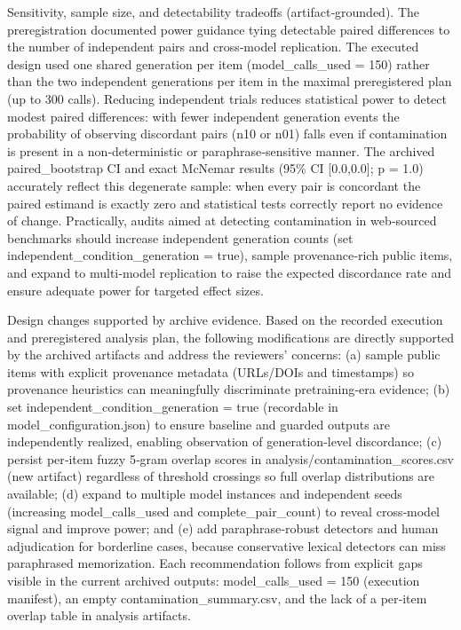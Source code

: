 \documentclass[conference]{IEEEtran}
\begin{document}
Sensitivity, sample size, and detectability tradeoffs (artifact‑grounded). The preregistration documented power guidance tying detectable paired differences to the number of independent pairs and cross‑model replication. The executed design used one shared generation per item (model\_calls\_used = 150) rather than the two independent generations per item in the maximal preregistered plan (up to 300 calls). Reducing independent trials reduces statistical power to detect modest paired differences: with fewer independent generation events the probability of observing discordant pairs (n10 or n01) falls even if contamination is present in a non‑deterministic or paraphrase‑sensitive manner. The archived paired\_bootstrap CI and exact McNemar results (95\% CI [0.0,0.0]; p = 1.0) accurately reflect this degenerate sample: when every pair is concordant the paired estimand is exactly zero and statistical tests correctly report no evidence of change. Practically, audits aimed at detecting contamination in web‑sourced benchmarks should increase independent generation counts (set independent\_condition\_generation = true), sample provenance‑rich public items, and expand to multi‑model replication to raise the expected discordance rate and ensure adequate power for targeted effect sizes.

Design changes supported by archive evidence. Based on the recorded execution and preregistered analysis plan, the following modifications are directly supported by the archived artifacts and address the reviewers' concerns: (a) sample public items with explicit provenance metadata (URLs/DOIs and timestamps) so provenance heuristics can meaningfully discriminate pretraining‑era evidence; (b) set independent\_condition\_generation = true (recordable in model\_configuration.json) to ensure baseline and guarded outputs are independently realized, enabling observation of generation‑level discordance; (c) persist per‑item fuzzy 5‑gram overlap scores in analysis/contamination\_scores.csv (new artifact) regardless of threshold crossings so full overlap distributions are available; (d) expand to multiple model instances and independent seeds (increasing model\_calls\_used and complete\_pair\_count) to reveal cross‑model signal and improve power; and (e) add paraphrase‑robust detectors and human adjudication for borderline cases, because conservative lexical detectors can miss paraphrased memorization. Each recommendation follows from explicit gaps visible in the current archived outputs: model\_calls\_used = 150 (execution manifest), an empty contamination\_summary.csv, and the lack of a per‑item overlap table in analysis artifacts.
\end{document}
